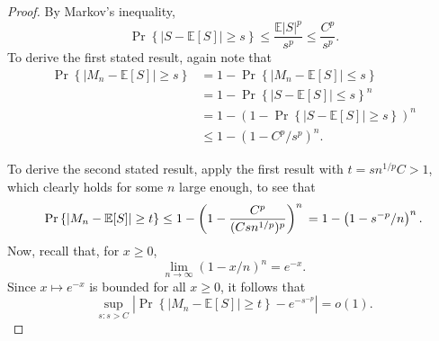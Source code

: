 \documentclass[
  12pt]{article}
\newcommand{\E}{\mathbb{E}}
\theoremstyle{definition}
\theoremstyle{plain}
\theoremstyle{plain}
\theoremstyle{plain}
\theoremstyle{remark}
\begin{document}
\begin{proof}
By Markov's inequality, \[
    \Pr\left\{ |S-\E[S]|\ge s\right\}\le \frac{\E|S|^p}{s^p}\le \frac{C^p}{s^p}.
\] To derive the first stated result, again note that \begin{align*}
\Pr\left\{|M_n-\E[S]|\ge s\right\}
& = 1 -\Pr\left\{|M_n-\E[S]|\le s\right\}               \\
& = 1-\Pr\left\{|S-\E[S]|\le s\right\}^n                \\
& = 1-\left(1-\Pr\left\{|S-\E[S]|\ge s\right\}\right)^n \\
& \le 1-(1-C^p/s^p)^n.
\end{align*}

To derive the second stated result, apply the first result with
\(t=sn^{1/p}C>1\), which clearly holds for some \(n\) large enough, to
see that \[
    \Pr\left\{|M_n-\E[S]|\ge t\right\}
    \le 1- \left(1-\frac{C^p}{(Csn^{1/p})^p}\right)^n \\
    = 1-\left(1-s^{-p}/n\right)^n.
\] Now, recall that, for \(x\ge0\), \[
    \lim_{n\rightarrow\infty}(1-x/n)^n=e^{-x}.
\] Since \(x\mapsto e^{-x}\) is bounded for all \(x\ge0\), it follows
that \[
    \sup_{s:s>C}\left|\Pr\left\{|M_n-\E[S]|\ge t\right\}-e^{-s^{-p}}\right|=o(1).
\]
\end{proof}
\end{document}
